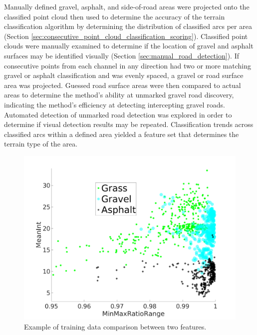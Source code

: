 \documentclass[numbered,pdftex]{ohio-etd}
\begin{document}
{		{Manually defined gravel, asphalt, and side-of-road areas were projected onto the classified point cloud then used to determine the accuracy of the terrain classification algorithm by determining the distribution of classified arcs per area (Section \ref{sec:consecutive_point_cloud_classification_scoring}). Classified point clouds were manually examined to determine if the location of gravel and asphalt surfaces may be identified visually (Section \ref{sec:manual_road_detection}). If consecutive points from each channel in any direction had two or more matching gravel or asphalt classification and was evenly spaced, a gravel or road surface area was projected. Guessed road surface areas were then compared to actual areas to determine the method's ability at unmarked gravel road discovery, indicating the method's efficiency at detecting intercepting gravel roads. Automated detection of unmarked road detection was explored in order to determine if visual detection results may be repeated. Classification trends across classified arcs within a defined area yielded a feature set that determines the terrain type of the area.}
		
		
		
		\begin{figure}[H]
			\centering
			\includegraphics[width=0.7\linewidth]{Defense_Images/training_data_cluster}
			\caption[Example Clustering]{Example of training data comparison between two features.}
			\label{fig:training_data_cluster}
		\end{figure}
		

}
\end{document}
